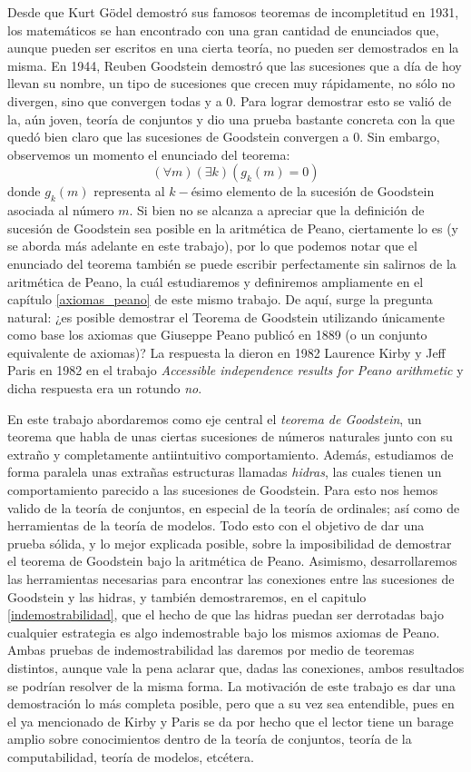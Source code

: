Desde que Kurt Gödel demostró sus famosos teoremas de incompletitud en 1931, los matemáticos se han encontrado con una gran cantidad de enunciados que, aunque pueden ser escritos en una cierta teoría, no pueden ser demostrados en la misma.
En 1944, Reuben Goodstein demostró que las sucesiones que a día de hoy llevan su nombre, un tipo de sucesiones que crecen muy rápidamente, no sólo no divergen, sino que convergen todas y a 0. Para lograr demostrar esto se valió de la, aún joven, teoría de conjuntos y  dio una prueba bastante concreta con la que quedó bien claro que las sucesiones de Goodstein convergen a 0. Sin embargo, observemos un momento el enunciado del teorema:
\[(\forall m)(\exists k)(g_{k}(m)=0)\]
donde $g_k(m)$ representa al $k-$ésimo elemento de la sucesión de Goodstein asociada al número $m$.
Si bien no se alcanza a apreciar que la definición de sucesión de Goodstein sea posible en la aritmética de Peano, ciertamente lo es (y se aborda más adelante en este trabajo), por lo que podemos notar que el enunciado del teorema también se puede escribir perfectamente sin salirnos de la aritmética de Peano, la cuál estudiaremos y definiremos ampliamente en el capítulo {\ref{axiomas_peano}} de este mismo trabajo.
De aquí, surge la pregunta natural: ¿es posible demostrar el Teorema de Goodstein utilizando únicamente como base los axiomas que Giuseppe Peano publicó en 1889 (o un conjunto equivalente de axiomas)?
La respuesta la dieron en 1982 Laurence Kirby y Jeff Paris en 1982 en el trabajo \textit{Accessible independence results for Peano arithmetic}{\cite{Goodstein}} y dicha respuesta era un rotundo \textit{no}.

En este trabajo abordaremos como eje central el \textit{teorema de Goodstein}, un teorema que habla de unas ciertas sucesiones de números naturales junto con su extraño y completamente antiintuitivo comportamiento. Además, estudiamos de forma paralela unas extrañas estructuras llamadas \textit{hidras}, las cuales tienen un comportamiento parecido a las sucesiones de Goodstein.
Para esto nos hemos valido de la teoría de conjuntos, en especial de la teoría de ordinales; así como de herramientas de la teoría de modelos. Todo esto con el objetivo de dar una prueba sólida, y lo mejor explicada posible, sobre la imposibilidad de demostrar el teorema de Goodstein bajo la aritmética de Peano.
Asimismo, desarrollaremos las herramientas necesarias para encontrar las conexiones entre las sucesiones de Goodstein y las hidras, y también demostraremos, en el capitulo \ref{indemostrabilidad}, que el hecho de que las hidras puedan ser derrotadas bajo cualquier estrategia es algo indemostrable bajo los mismos axiomas de Peano. 
Ambas pruebas de indemostrabilidad las daremos por medio de teoremas distintos, aunque vale la pena aclarar que, dadas las conexiones, ambos resultados se podrían resolver de la misma forma.
La motivación de este trabajo es dar una demostración lo más completa posible, pero que a su vez sea entendible, pues en el ya mencionado de Kirby y Paris se da por hecho que el lector tiene un barage amplio sobre conocimientos dentro de la teoría de conjuntos, teoría de la computabilidad, teoría de modelos, etcétera.


